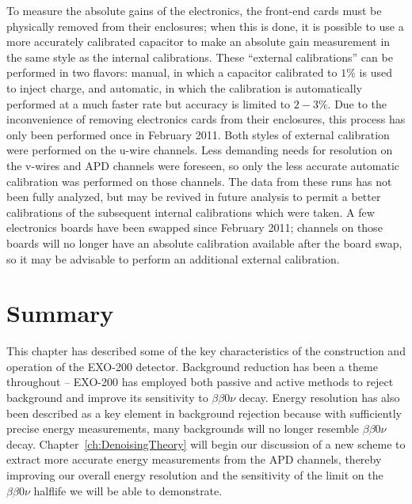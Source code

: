 To measure the absolute gains of the electronics, the front-end cards must be physically removed from their enclosures; when this is done, it is possible to use a more accurately calibrated capacitor to make an absolute gain measurement in the same style as the internal calibrations.  These ``external calibrations'' can be performed in two flavors: manual, in which a capacitor calibrated to $1\%$ is used to inject charge, and automatic, in which the calibration is automatically performed at a much faster rate but accuracy is limited to $2-3\%$.  Due to the inconvenience of removing electronics cards from their enclosures, this process has only been performed once in February 2011.  Both styles of external calibration were performed on the u-wire channels.  Less demanding needs for resolution on the v-wires and APD channels were foreseen, so only the less accurate automatic calibration was performed on those channels.  The data from these runs has not been fully analyzed, but may be revived in future analysis to permit a better calibrations of the subsequent internal calibrations which were taken.  A few electronics boards have been swapped since February 2011; channels on those boards will no longer have an absolute calibration available after the board swap, so it may be advisable to perform an additional external calibration.~\cite{EnergyDocumentRun2a}

\section{Summary}

This chapter has described some of the key characteristics of the construction and operation of the EXO-200 detector.  Background reduction has been a theme throughout -- EXO-200 has employed both passive and active methods to reject background and improve its sensitivity to $\beta\beta 0\nu$ decay.  Energy resolution has also been described as a key element in background rejection because with sufficiently precise energy measurements, many backgrounds will no longer resemble $\beta\beta 0\nu$ decay.  Chapter~\ref{ch:DenoisingTheory} will begin our discussion of a new scheme to extract more accurate energy measurements from the APD channels, thereby improving our overall energy resolution and the sensitivity of the limit on the $\beta\beta 0\nu$ halflife we will be able to demonstrate.
